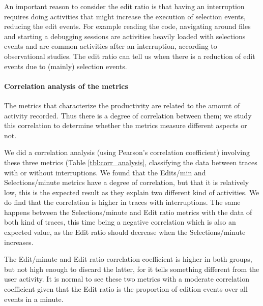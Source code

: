 \documentclass[times]{smrauth}
\newcommand\RR[1]{\textbf{Romain #1}}
\begin{document}

An important reason to consider the edit ratio is that having an interruption requires doing activities that might increase the execution of selection events, reducing the edit events. For example reading the code, navigating around files and starting a debugging sessions are activities heavily loaded with selections events and are common activities after an interruption, according to observational studies. The edit ratio can tell us when there is a reduction of edit events due to (mainly) selection events.

\paragraph{Correlation analysis of the metrics}
The metrics that characterize the productivity are related to the amount of activity recorded. Thus there is a degree of correlation between them; we study this correlation to determine whether the metrics measure different aspects or not.  %

We did a correlation analysis (using Pearson's correlation coefficient) involving these three metrics (Table \ref{tbl:corr_analysis}, classifying the data between traces with or without interruptions. We found that the Edits/min and Selections/minute metrics have a degree of correlation, but that it is relatively low, this is the expected result as they explain two different kind of activities. We do find that the correlation is higher in traces with interruptions. The same happens between the Selections/minute and Edit ratio metrics with the data of both kind of traces, this time being a negative correlation which is also an expected value, as the Edit ratio should decrease when the Selections/minute increases. 

The Edit/minute and Edit ratio correlation coefficient is higher in both groups, but not high enough to discard the latter, for it tells something different from the user activity. It is normal to see these two metrics with a moderate correlation coefficient given that the Edit ratio is the proportion of edition events over all events in a minute.
\end{document}
